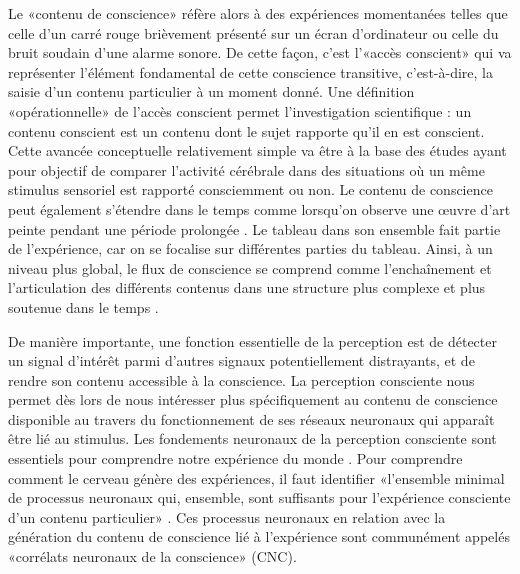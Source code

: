 Le «contenu de conscience» réfère alors à des expériences momentanées telles que celle d'un carré rouge brièvement présenté sur un écran d'ordinateur ou celle du bruit soudain d'une alarme sonore. 
De cette façon, c'est l'«accès conscient» qui va représenter l'élément fondamental de cette conscience transitive, c'est-à-dire, la saisie d'un contenu particulier à un moment donné. 
Une définition «opérationnelle» de l'accès conscient permet l'investigation scientifique : un contenu conscient est un contenu dont le sujet rapporte qu'il en est conscient. 
Cette avancée conceptuelle relativement simple va être à la base des études ayant pour objectif de comparer l'activité cérébrale dans des situations où un même stimulus sensoriel est rapporté consciemment ou non. 
Le contenu de conscience peut également s'étendre dans le temps comme lorsqu'on observe une œuvre d'art peinte pendant une période prolongée \citep{eklund2019electrophysiological}. 
Le tableau dans son ensemble fait partie de l'expérience, car on se focalise sur différentes parties du tableau. 
Ainsi, à un niveau plus global, le flux de conscience se comprend comme l'enchaînement et l'articulation des différents contenus dans une structure plus complexe et plus soutenue dans le temps \citep{khamassi2021neurosciences}. 

De manière importante, une fonction essentielle de la perception est de détecter un signal d'intérêt parmi d'autres signaux potentiellement distrayants, et de rendre son contenu accessible à la conscience. 
La perception consciente nous permet dès lors de nous intéresser plus spécifiquement au contenu de conscience disponible au travers du fonctionnement de ses réseaux neuronaux qui apparaît être lié au stimulus. 
Les fondements neuronaux de la perception consciente sont essentiels pour comprendre notre expérience du monde \citep{block2007consciousness, crick1998consciousness, dehaene2011experimental}. 
Pour comprendre comment le cerveau génère des expériences, il faut identifier «l'ensemble minimal de processus neuronaux qui, ensemble, sont suffisants pour l'expérience consciente d'un contenu particulier» \citep{aru2012distilling}. 
Ces processus neuronaux en relation avec la génération du contenu de conscience lié à l'expérience sont communément appelés «corrélats neuronaux de la conscience» (CNC). 

